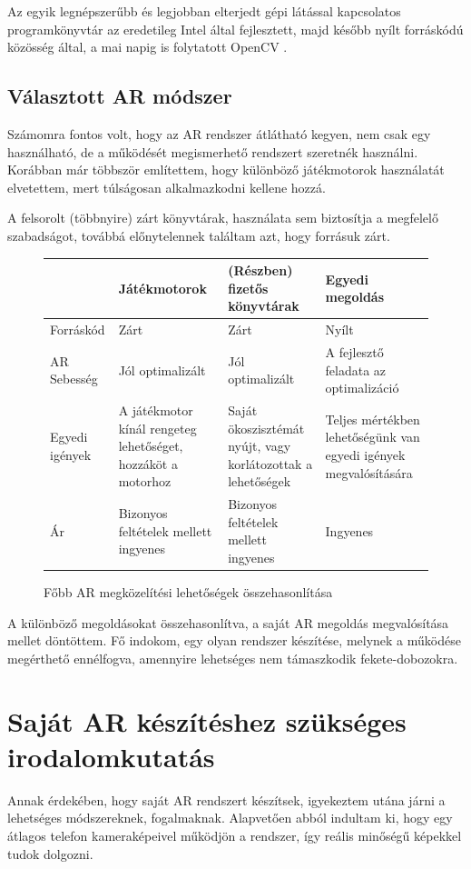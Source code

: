 \documentclass[12pt,a4paper,oneside]{report} %
\begin{document}
\par Az egyik legnépszerűbb és  legjobban elterjedt gépi látással kapcsolatos programkönyvtár az eredetileg Intel által fejlesztett,  majd később nyílt forráskódú közösség által, a mai napig is folytatott OpenCV \cite{opencv_library}.
\subsection{Választott AR módszer}
Számomra fontos volt, hogy az AR rendszer átlátható kegyen, nem csak egy használható, de a működését megismerhető rendszert szeretnék használni. Korábban már többször említettem, hogy különböző játékmotorok használatát elvetettem, mert túlságosan alkalmazkodni kellene hozzá. 
\par A felsorolt (többnyire) zárt könyvtárak, használata sem biztosítja a megfelelő szabadságot, továbbá előnytelennek találtam azt, hogy forrásuk zárt.


\begin{figure}[H]
	\centering
	\begin{tabular}{s|p{3.5cm}|p{3.5cm}|p{3.5cm} }
		& Játékmotorok &(Részben) fizetős könyvtárak &  Egyedi megoldás \\
		\hline
		Forráskód & Zárt & Zárt & Nyílt \\
		AR Sebesség & Jól optimalizált & Jól optimalizált & A fejlesztő feladata az optimalizáció \\
		Egyedi igények   & A játékmotor kínál rengeteg lehetőséget, hozzáköt a motorhoz & Saját ökoszisztémát nyújt, vagy korlátozottak a lehetőségek   & Teljes mértékben lehetőségünk van egyedi igények megvalósítására  \\
		Ár & Bizonyos feltételek mellett ingyenes & Bizonyos feltételek mellett ingyenes & Ingyenes\\
		
	\end{tabular}
	\caption{Főbb AR megközelítési lehetőségek összehasonlítása}
\end{figure}

A különböző megoldásokat összehasonlítva, a saját AR megoldás megvalósítása mellet döntöttem. Fő indokom, egy olyan rendszer készítése, melynek a működése megérthető ennélfogva, amennyire lehetséges nem támaszkodik fekete-dobozokra.

\section{Saját AR készítéshez szükséges irodalomkutatás}
Annak érdekében, hogy saját AR rendszert készítsek, igyekeztem utána járni a lehetséges módszereknek, fogalmaknak.
Alapvetően abból indultam ki, hogy egy átlagos telefon kameraképeivel működjön a rendszer, így reális minőségű képekkel tudok dolgozni.
\end{document}
